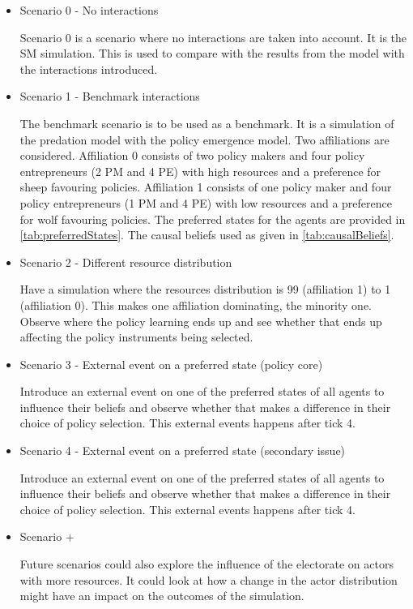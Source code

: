 \documentclass[12pt]{article}
\begin{document}
\begin{itemize}
\item Scenario 0 - No interactions

Scenario 0 is a scenario where no interactions are taken into account. It is the SM simulation. This is used to compare with the results from the model with the interactions introduced.


\item Scenario 1 - Benchmark interactions

The benchmark scenario is to be used as a benchmark. It is a simulation of the predation model with the policy emergence model. Two affiliations are considered. Affiliation 0 consists of two policy makers and four policy entrepreneurs (2 PM and 4 PE) with high resources and a preference for sheep favouring policies. Affiliation 1 consists of one policy maker and four policy entrepreneurs (1 PM and 4 PE) with low resources and a preference for wolf favouring policies. The preferred states for the agents are provided in \autoref{tab:preferredStates}. The causal beliefs used as given in \autoref{tab:causalBeliefs}.

\item Scenario 2 - Different resource distribution

Have a simulation where the resources distribution is 99 (affiliation 1) to 1 (affiliation 0). This makes one affiliation dominating, the minority one. Observe where the policy learning ends up and see whether that ends up affecting the policy instruments being selected.

\item Scenario 3 - External event on a preferred state (policy core)

Introduce an external event on one of the preferred states of all agents to influence their beliefs and observe whether that makes a difference in their choice of policy selection. This external events happens after tick 4.

\item Scenario 4 - External event on a preferred state (secondary issue)

Introduce an external event on one of the preferred states of all agents to influence their beliefs and observe whether that makes a difference in their choice of policy selection. This external events happens after tick 4.

\item Scenario +

Future scenarios could also explore the influence of the electorate on actors with more resources. It could look at how a change in the actor distribution might have an impact on the outcomes of the simulation.

\end{itemize}
\end{document}
